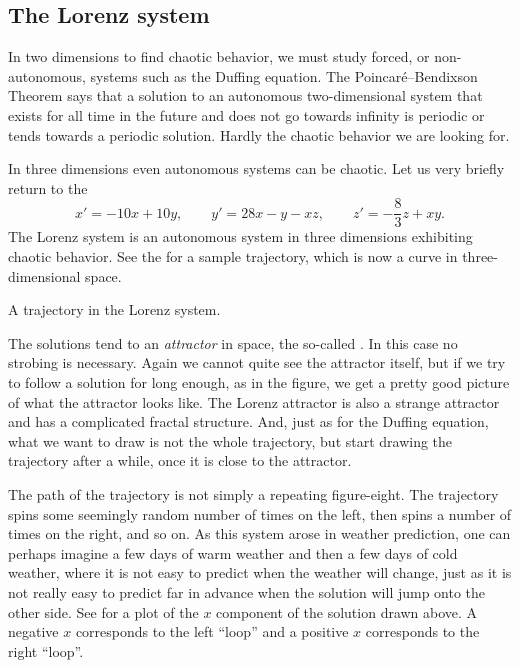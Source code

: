 \documentclass{ximera}
\begin{document}
\subsection{The Lorenz system}

In two dimensions to find chaotic behavior, we must study forced, or non-autonomous, systems such as the Duffing equation. The Poincar\'e--Bendixson Theorem says that a solution to an autonomous two-dimensional system that exists for all time in the future and does not go towards infinity is periodic or tends towards a periodic solution.  Hardly the chaotic behavior we are looking for.

In three dimensions even autonomous systems can be chaotic. Let us very briefly return to the 
\begin{equation*}
    x' = -10x +10y, \qquad y' = 28x-y-xz, \qquad z'=-\frac{8}{3}z + xy .
\end{equation*}
The Lorenz system is an autonomous system in three dimensions exhibiting chaotic behavior. See the  for a sample trajectory, which is now a curve in three-dimensional space.
\begin{myfig}
    \capstart
    \caption{A trajectory in the Lorenz system. \label{nlin:lorenz}}
\end{myfig}

The solutions tend to an \emph{attractor} in space, the so-called \emph{}. In this case no strobing is necessary. Again we cannot quite see the attractor itself, but if we try to follow a solution for long enough, as in the figure, we get a pretty good picture of what the attractor looks like. The Lorenz attractor is also a strange attractor and has a complicated fractal structure.  And, just as for the Duffing equation, what we want to draw is not the whole trajectory, but start drawing the trajectory after a while, once it is close to the attractor.

The path of the trajectory is not simply a repeating figure-eight. The trajectory spins some seemingly random number of times on the left, then spins a number of times on the right, and so on.  As this system arose in weather prediction, one can perhaps imagine a few days of warm weather and then a few days of cold weather, where it is not easy to predict when the weather will change, just as it is not really easy to predict far in advance when the solution will jump onto the other side.  See  for a plot of the $x$ component of the solution drawn above.  A negative $x$ corresponds to the left ``loop'' and a positive $x$ corresponds to the right ``loop''.
\end{document}
